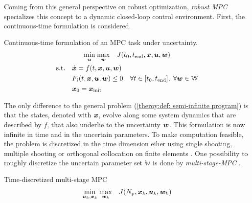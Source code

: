 Coming from this general perspective on robust optimization, \emph{robust MPC} specializes
this concept to a dynamic closed-loop control environment. First, the continuous-time
formulation is considered.

\begin{definition} Continuous-time formulation of an MPC task under uncertainty.
    \label{theory:def: continuous mpc}
    \[
        \begin{gathered}
            \underset{{\bm{u}}}{\min} \; \underset{{\bm{w}}}{\max} \quad  J(t_0, t_\text{end}, {\bm{x}}, {\bm{u}}, {\bm{w}}) \\
            \begin{aligned}
                \text{s.t.} \quad &\dot{{\bm{x}}} = f(t, {\bm{x}}, {\bm{u}}, {\bm{w}}) \\
                & F_i(t, {\bm{x}}, {\bm{u}}, {\bm{w}}) \leq 0 \quad \forall t \in [t_0, t_\text{end}], \; \forall {\bm{w}} \in \mathbb{W} \\
                & {\bm{x}}_0 = {\bm{x}}_\text{init}
            \end{aligned}
        \end{gathered}
    \]
\end{definition}

The only difference to the general problem (\ref{theroy:def: semi-infinite program}) is that the states, denoted with ${\bm{x}}$,
evolve along some system dynamics that are described by $f$, that also underlie to the uncertainty ${\bm{w}}$.
This formulation is now infinite in time and in the uncertain parameters. To make computation feasible,
the problem is discretized in the time dimension eiher using single shooting, multiple shooting or orthogonal collocation
on finite elements \cite{biegler2010}. One possibility to roughly discretize the uncertain parameter set $\mathbb{W}$ is
done by \emph{multi-stage-MPC} \cite{lucia2015}. 


\begin{definition} Time-discretized multi-stage MPC
    \label{theory:def: multi-stage-mpc}
    \[
        \begin{gathered}
            \underset{{\bm{u}}_k, {\bm{x}}_k}{\min} \; \underset{{\bm{w}}_k}{\max}  \quad  J(N_\text{p}, {\bm{x}}_k, {\bm{u}}_k, {\bm{w}}_k)
        \end{gathered}
    \]
\end{definition}

